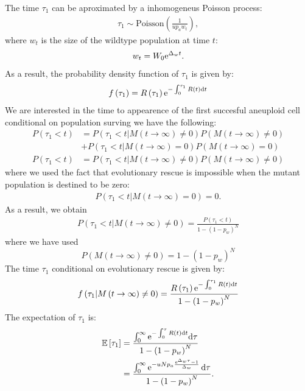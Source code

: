 \documentclass[12pt]{extarticle}
\renewcommand{\d}{{\rm d}}
\newcommand{\e}{{\rm e}}
\begin{document}
The time $\tau_1$ can be aproximated by a inhomogeneus Poisson process:
\begin{align}
\tau_1\sim \text{Poisson}\left(\frac{1}{up_aw_t}\right),
\end{align}
where $w_t$ is the size of the wildtype population at time $t$: 
\begin{equation}
w_t=W_0\e^{\Delta_wt}.
\end{equation}
As a result, the probability density function of $\tau_1$ is given by:
\begin{align}
f\left(\tau_1\right)=R\left(\tau_1\right)\e^{-\int_0^{\tau_1} R(t)\d t}
\end{align}
We are interested in the time to appearence of the first succesful aneuploid cell conditional on population surving we have the following:
\begin{align*}
P\left(\tau_1<t\right)&=P\left(\tau_1<t|M\left(t\rightarrow\infty\right)\neq0\right)P\left(M\left(t\rightarrow\infty\right)\neq0\right)\\
&+P\left(\tau_1<t|M\left(t\rightarrow\infty\right)=0\right)P\left(M\left(t\rightarrow\infty\right)=0\right)\\
P\left(\tau_1<t\right)&=P\left(\tau_1<t|M\left(t\rightarrow\infty\right)\neq0\right)P\left(M\left(t\rightarrow\infty\right)\neq0\right)
\end{align*}
where we used the fact that evolutionary rescue is impossible when the mutant population is destined to be zero:
\begin{align*}
P\left(\tau_1<t|M\left(t\rightarrow\infty\right)=0\right)=0.
\end{align*}
As a result, we obtain 
\begin{align}
P\left(\tau_1<t|M\left(t\rightarrow\infty\right)\neq0\right)=\frac{P\left(\tau_1<t\right)}{1-\left(1-p_w\right)^N}
\end{align}
where we have used
\begin{equation}
P\left(M\left(t\rightarrow\infty\right)\neq0\right)=1-\left(1-p_w\right)^N
\end{equation}
The time $\tau_1$ conditional on evolutionary rescue is given by:
\begin{align}
f\left(\tau_1|M\left(t\rightarrow\infty\right)\neq0\right)=\frac{R\left(\tau_1\right)\e^{-\int_0^{\tau_1} R(t)\d t}}{1-\left(1-p_w\right)^N}
\end{align}
The expectation of $\tau_1$ is:
\begin{align}\nonumber
\mathbb{E}\left[\tau_1\right]&=\frac{\int_0^\infty\e^{-\int_0^\tau R(t)\d t}\d\tau}{1-\left(1-p_w\right)^N}\\
&=\frac{\int_0^\infty\e^{-uNp_a\frac{\e^{\Delta_w\tau}-1}{\Delta_w}}\,\d\tau}{1-\left(1-p_w\right)^N}.
\end{align}
\end{document}
